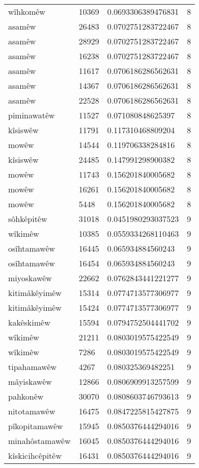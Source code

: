 \begin{longtable}{llll}
wîhkomêw & 10369 & 0.0693306389476831 & 8\\
asamêw & 26483 & 0.0702751283722467 & 8\\
asamêw & 28929 & 0.0702751283722467 & 8\\
asamêw & 16238 & 0.0702751283722467 & 8\\
asamêw & 11617 & 0.0706186286562631 & 8\\
asamêw & 14367 & 0.0706186286562631 & 8\\
asamêw & 22528 & 0.0706186286562631 & 8\\
piminawatêw & 11527 & 0.071080848625397 & 8\\
kîsiswêw & 11791 & 0.117310468809204 & 8\\
mowêw & 14544 & 0.119706338284816 & 8\\
kîsiswêw & 24485 & 0.147991298900382 & 8\\
mowêw & 11743 & 0.156201840005682 & 8\\
mowêw & 16261 & 0.156201840005682 & 8\\
mowêw & 5448 & 0.156201840005682 & 8\\
sôhkêpitêw & 31018 & 0.0451980293037523 & 9\\
wîkimêw & 10385 & 0.0559334268110463 & 9\\
osîhtamawêw & 16445 & 0.065934884560243 & 9\\
osîhtamawêw & 16454 & 0.065934884560243 & 9\\
miyoskawêw & 22662 & 0.0762843441221277 & 9\\
kitimâkêyimêw & 15314 & 0.0774713577306977 & 9\\
kitimâkêyimêw & 15424 & 0.0774713577306977 & 9\\
kakêskimêw & 15594 & 0.0794752504441702 & 9\\
wîkimêw & 21211 & 0.0803019575422549 & 9\\
wîkimêw & 7286 & 0.0803019575422549 & 9\\
tipahamawêw & 4267 & 0.080325369482251 & 9\\
mâyiskawêw & 12866 & 0.0806909913257599 & 9\\
pahkonêw & 30070 & 0.0808603746793613 & 9\\
nitotamawêw & 16475 & 0.0847225815427875 & 9\\
pîkopitamawêw & 15945 & 0.0850376444294016 & 9\\
minahôstamawêw & 16045 & 0.0850376444294016 & 9\\
kîskicihcêpitêw & 16431 & 0.0850376444294016 & 9\\

\end{longtable}
